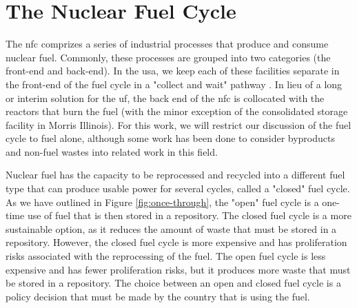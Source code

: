 \section{The Nuclear Fuel Cycle}
\label{sec:nfc}

The \gls{nfc} comprizes a series of industrial processes that produce and consume nuclear fuel. Commonly, these processes are grouped into two categories (the front-end and back-end). In the \gls{usa}, we keep each of these facilities separate in the front-end of the fuel cycle in a "collect and wait" pathway \cite{cycle_risks}. In lieu of a long or interim solution for the \gls{uf}, the back end of the \gls{nfc} is collocated with the reactors that burn the fuel (with the minor exception of the consolidated storage facility in Morris Illinois). For this work, we will restrict our discussion of the fuel cycle to fuel alone, although some work has been done to consider byproducts and non-fuel wastes into related work in this field.


Nuclear fuel has the capacity to be reprocessed and recycled into a different fuel type that can produce usable power for several cycles, called a "closed" fuel cycle. As we have outlined in Figure \ref{fig:once-through}, the "open" fuel cycle is a one-time use of fuel that is then stored in a repository. The closed fuel cycle is a more sustainable option, as it reduces the amount of waste that must be stored in a repository. However, the closed fuel cycle is more expensive and has proliferation risks associated with the reprocessing of the fuel. The open fuel cycle is less expensive and has fewer proliferation risks, but it produces more waste that must be stored in a repository. The choice between an open and closed fuel cycle is a policy decision that must be made by the country that is using the fuel.










